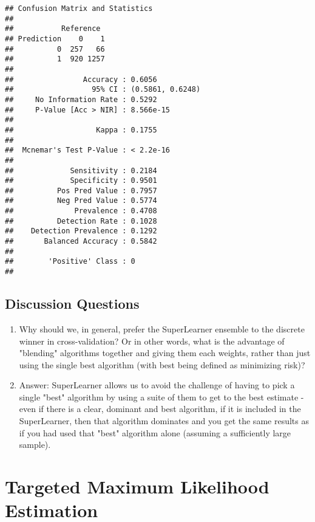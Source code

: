 \documentclass[
]{article}
\begin{document}
\begin{verbatim}
## Confusion Matrix and Statistics
## 
##           Reference
## Prediction    0    1
##          0  257   66
##          1  920 1257
##                                           
##                Accuracy : 0.6056          
##                  95% CI : (0.5861, 0.6248)
##     No Information Rate : 0.5292          
##     P-Value [Acc > NIR] : 8.566e-15       
##                                           
##                   Kappa : 0.1755          
##                                           
##  Mcnemar's Test P-Value : < 2.2e-16       
##                                           
##             Sensitivity : 0.2184          
##             Specificity : 0.9501          
##          Pos Pred Value : 0.7957          
##          Neg Pred Value : 0.5774          
##              Prevalence : 0.4708          
##          Detection Rate : 0.1028          
##    Detection Prevalence : 0.1292          
##       Balanced Accuracy : 0.5842          
##                                           
##        'Positive' Class : 0               
## 
\end{verbatim}

\hypertarget{discussion-questions}{%
\subsection{Discussion Questions}\label{discussion-questions}}

\begin{enumerate}
    \item Why should we, in general, prefer the SuperLearner ensemble to the discrete winner in cross-validation? Or in other words, what is the advantage of "blending" algorithms together and giving them each weights, rather than just using the single best algorithm (with best being defined as minimizing risk)?
    \item Answer: SuperLearner allows us to avoid the challenge of having to pick a single "best" algorithm by using a suite of them to get to the best estimate - even if there is a clear, dominant and best algorithm, if it is included in the SuperLearner, then that algorithm dominates and you get the same results as if you had used that "best" algorithm alone (assuming a sufficiently large sample). 
\end{enumerate}

\hypertarget{targeted-maximum-likelihood-estimation}{%
\section{Targeted Maximum Likelihood
Estimation}\label{targeted-maximum-likelihood-estimation}}
\end{document}
